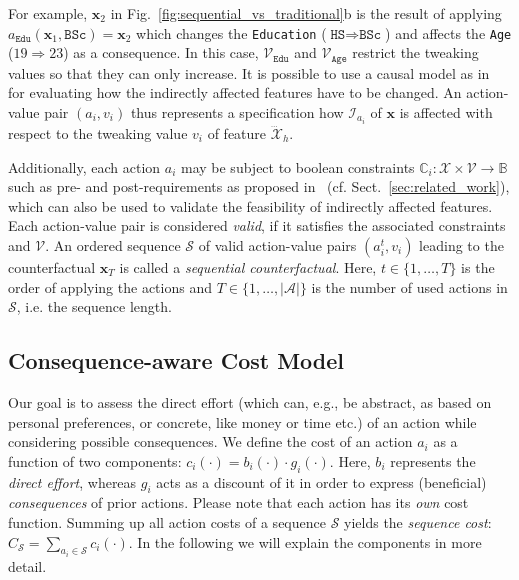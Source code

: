 \documentclass[runningheads, envcountsame, a4paper]{llncs}
\newcommand{\actions}{\mathcal{A}}
\newcommand{\action}{a}
\newcommand{\Values}{\mathcal{V}}
\newcommand{\Value}{v}
\newcommand{\state}{\mathbf{x}}
\newcommand{\featurespace}{\mathcal{X}}
\newcommand{\feature}{\dddot{\featurespace}}
\newcommand{\featureindex}{\mathcal{I}}
\newcommand{\constraint}{\mathbb{C}}
\newcommand{\sequence}{\mathcal{S}}
\newcommand{\consequentialCosts}{g}
\newcommand{\baseCosts}{b}
\newcommand{\costs}{c}
\newcommand{\totalCosts}{C}
\newcommand{\finalsolution}{\state_{T}}
\begin{document}
For example, $\state_2$ in Fig.~\ref{fig:sequential_vs_traditional}b is the result of applying $\action_{\texttt{Edu}}(\state_1, \texttt{BSc}) = \state_2$ which changes the \texttt{Education} ($\texttt{HS} \Rightarrow \texttt{BSc}$) and affects the \texttt{Age} ($19 \Rightarrow 23$) as a consequence. In this case, $\Values_{\texttt{Edu}}$ and $\Values_{\texttt{Age}}$ restrict the tweaking values so that they can only increase.
%
It is possible to use a causal model as in~\cite{karimiAlgorithmicRecourseImperfect2020a} for evaluating how the indirectly affected features have to be changed.
An action-value pair $(\action_i, \Value_i)$ thus represents a specification how $\featureindex_{\action_i}$ of $\state$ is affected with respect to the tweaking value $\Value_i$ of feature $\feature_h$. 

Additionally, each action $\action_i$ may be subject to boolean constraints $\constraint_i: \featurespace \times \Values \to \mathbb{B}$ such as pre- and post-requirements as proposed in~\cite{ramakrishnanSynthesizingActionSequences2020} (cf. Sect.~\ref{sec:related_work}), which can also be used to validate the feasibility of indirectly affected features. Each action-value pair is considered \emph{valid}, if it satisfies the associated constraints and $\Values$.
An ordered sequence $\sequence$ of valid action-value pairs $(\action_i^t, \Value_i)$ leading to the counterfactual $\finalsolution$ is called a \emph{sequential counterfactual}. Here, $t \in \{1,\dots,T\}$ is the order of applying the actions and $T \in \{1,\dots,|\actions|\}$ is the number of used actions in $\sequence$, i.e. the sequence length.

\subsection{Consequence-aware Cost Model}
\label{sec:costs}
Our goal is to assess the direct effort (which can, e.g., be abstract, as based on personal preferences, or concrete, like money or time etc.) of an action while considering possible consequences. We define the cost of an action $\action_i$ as a function of two components: $\costs_i(\cdot) = \baseCosts_i(\cdot) \cdot \consequentialCosts_i(\cdot)$. Here, $\baseCosts_i$ represents the \emph{direct effort}, whereas $\consequentialCosts_i$ acts as a discount of it in order to express (beneficial) \emph{consequences} of prior actions.
Please note that each action has its \emph{own} cost function.
Summing up all action costs of a sequence $\sequence$ yields the \emph{sequence cost}: $\totalCosts_\sequence = \sum_{\action_i \in \sequence} \costs_i(\cdot)$.
In the following we will explain the components in more detail.
\end{document}

